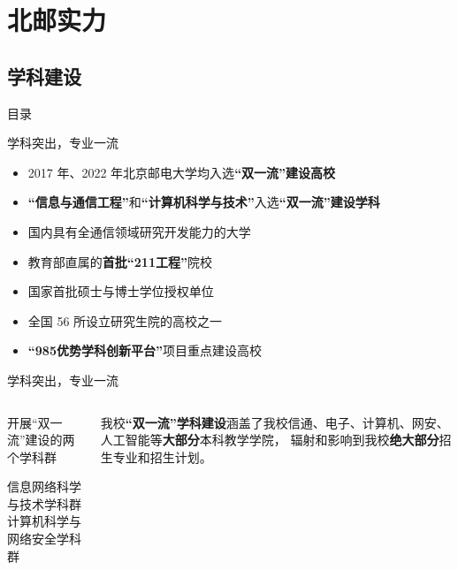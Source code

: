 \documentclass[aspectratio=169, utf8, fontset=windows]{beamer}
\begin{document}
\section{北邮实力}

\subsection*{学科建设}

\begin{frame}{目录}
    \begin{multicols}{2}
        \tableofcontents[sectionstyle=show,subsectionstyle=hide,currentsection]
    \end{multicols}
\end{frame}

\begin{frame}{学科突出，专业一流}
    \begin{itemize}
        \item 2017 年、2022 年北京邮电大学均入选\textcolor{Fore}{\textbf{“双一流”建设高校}}
        \item \textcolor{Fore}{\textbf{“信息与通信工程”}}和\textcolor{Fore}{\textbf{“计算机科学与技术”}}入选\textcolor{Fore}{\textbf{“双一流”建设学科}}
        \item 国内具有全通信领域研究开发能力的大学
        \item 教育部直属的\textcolor{Fore}{\textbf{首批“211工程”}}院校
        \item 国家首批硕士与博士学位授权单位
        \item 全国 56 所设立研究生院的高校之一
        \item \textcolor{Fore}{\textbf{“985优势学科创新平台”}}项目重点建设高校
    \end{itemize}
\end{frame}

\begin{frame}{学科突出，专业一流}
    \begin{columns}
        \begin{block}{开展“双一流”建设的两个学科群}
            \begin{multicols}{2}
                \centering

                信息网络科学与技术学科群\\

                计算机科学与网络安全学科群
            \end{multicols}
        \end{block}

        \setlength{\parindent}{2em}

        我校\textcolor{Fore}{\textbf{“双一流”学科建设}}涵盖了我校信通、电子、计算机、网安、人工智能等\textcolor{Fore}{\textbf{大部分}}本科教学学院，
        辐射和影响到我校\textcolor{Fore}{\textbf{绝大部分}}招生专业和招生计划。
    \end{columns}
\end{frame}
\end{document}
